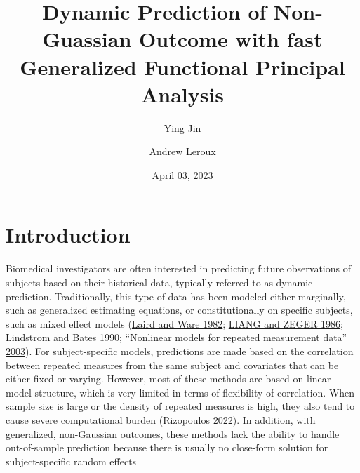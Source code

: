 \documentclass[
  11pt,
]{article}
\title{Dynamic Prediction of Non-Guassian Outcome with fast Generalized
Functional Principal Analysis}
\author{Ying Jin \and Andrew Leroux}
\date{April 03, 2023}
\begin{document}
\maketitle

\hypertarget{introduction}{%
\section{Introduction}\label{introduction}}

Biomedical investigators are often interested in predicting future
observations of subjects based on their historical data, typically
referred to as dynamic prediction. Traditionally, this type of data has
been modeled either marginally, such as generalized estimating
equations, or constitutionally on specific subjects, such as mixed
effect models (\protect\hyperlink{ref-Laird1982}{Laird and Ware 1982};
\protect\hyperlink{ref-liang1986}{LIANG and ZEGER 1986};
\protect\hyperlink{ref-lindstrom1990}{Lindstrom and Bates 1990};
\protect\hyperlink{ref-davidian2003}{{``Nonlinear models for repeated
measurement data''} 2003}). For subject-specific models, predictions are
made based on the correlation between repeated measures from the same
subject and covariates that can be either fixed or varying. However,
most of these methods are based on linear model structure, which is very
limited in terms of flexibility of correlation. When sample size is
large or the density of repeated measures is high, they also tend to
cause severe computational burden
(\protect\hyperlink{ref-GLMMadaptive}{Rizopoulos 2022}). In addition,
with generalized, non-Gaussian outcomes, these methods lack the ability
to handle out-of-sample prediction because there is usually no
close-form solution for subject-specific random effects
\end{document}
